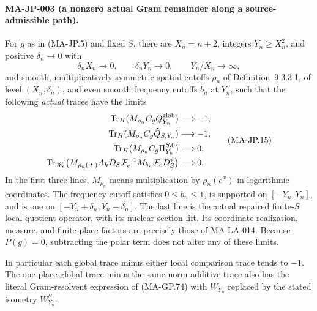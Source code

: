 \paragraph{MA-JP-003 (a nonzero actual Gram remainder along a source-admissible path).}
For $g$ as in (MA-JP.5) and fixed $S$, there are
$X_n=n+2$, integers $Y_n\ge X_n^2$, and positive
$\delta_n\to0$ with
\[
 \delta_nX_n\longrightarrow0,\qquad
 \delta_nY_n\longrightarrow0,\qquad Y_n/X_n\longrightarrow\infty,
 \tag{MA-JP.14}
\]
and smooth, multiplicatively symmetric spatial cutoffs
$\rho_n$ of Definition~9.3.3.1, of level $(X_n,\delta_n)$,
and even smooth frequency cutoffs $b_n$ at $Y_n$, such that
the following \emph{actual} traces have the limits
\[
 \begin{aligned}
 \operatorname{Tr}_H(M_{\rho_n}C_gQ_{Y_n}^{\rm glob})
       &\longrightarrow-1,\\
 \operatorname{Tr}_H(M_{\rho_n}C_g\widehat Q_{S,Y_n})
       &\longrightarrow-1,\\
 \operatorname{Tr}_H(M_{\rho_n}C_g\Pi_{Y_n}^{S,0})
       &\longrightarrow0,\\
 \operatorname{Tr}_{\mathscr H_e}
   \bigl(M_{\rho_n(|t|)}A_hD_S
           \mathcal F_e^{-1}M_{b_n}\mathcal F_eD_S^*\bigr)
       &\longrightarrow0 .
 \end{aligned}
 \tag{MA-JP.15}
\]
In the first three lines, $M_{\rho_n}$ means multiplication
by $\rho_n(e^x)$ in logarithmic coordinates.
The frequency cutoff satisfies $0\le b_n\le1$, is
supported on $[-Y_n,Y_n]$, and is one on
$[-Y_n+\delta_n,Y_n-\delta_n]$.
The last line is the actual repaired finite-$S$ local
quotient operator, with its nuclear section lift.
Its coordinate realization, measure, and finite-place
factors are precisely those of MA-LA-014.
Because $P(g)=0$, subtracting the polar term does not
alter any of these limits.

In particular each global trace minus either local
comparison trace tends to $-1$.  The one-place global
trace minus the same-norm additive trace also has the
literal Gram-resolvent expression of (MA-GP.74) with
$W_{Y_n}$ replaced by the stated isometry $W_{Y_n}^S$.

